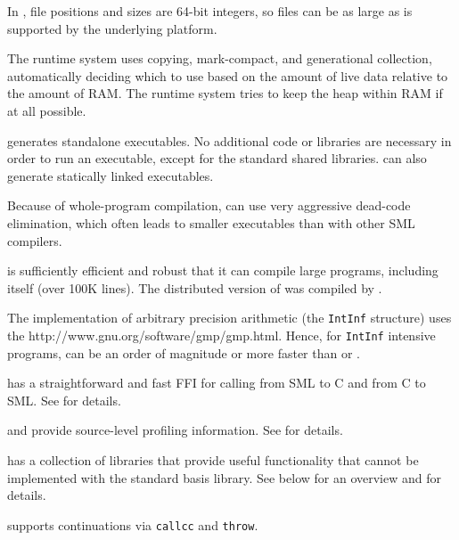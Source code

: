 \begin{description}
In {\mlton}, file positions and sizes are 64-bit integers, so files
can be as large as is supported by the underlying platform.

The {\mlton} runtime system uses copying, mark-compact, and generational
collection, automatically deciding which to use based on the amount of live
data relative to the amount of RAM.  The runtime system tries to keep the heap
within RAM if at all possible.

{\mlton} generates standalone executables.  No additional code or
libraries are necessary in order to run an executable, except for
the standard shared libraries.  {\mlton} can also generate statically
linked executables.

Because of whole-program compilation, {\mlton} can use very aggressive 
dead-code elimination, which often leads to smaller executables than
with other SML compilers.

{\mlton} is sufficiently efficient and robust that it can compile
large programs, including itself (over 100K lines).  The distributed
version of {\mlton} was compiled by {\mlton}.

The {\mlton} implementation of arbitrary precision arithmetic (the
{\tt IntInf} structure) uses the
		  {http://www.gnu.org/software/gmp/gmp.html}.
Hence, for {\tt IntInf} intensive programs, {\mlton} can be an order
of magnitude or more faster than {\poly} or {\smlnj}.

{\mlton} has a straightforward and fast FFI for calling from SML to C
and from C to SML.  See  for details.

{\mlton} and {\mlprof} provide source-level profiling information.
See  for details.

{\mlton} has a collection of libraries that provide useful functionality that
cannot be implemented with the standard basis library.  See below for an
overview and  for details.

\begin{description}

{\mlton} supports continuations via {\tt callcc} and {\tt throw}.


\end{description}
\end{description}
